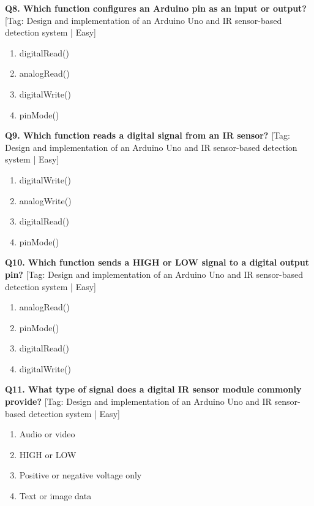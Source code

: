 \noindent\textbf{Q8. Which function configures an Arduino pin as an input or output?} \hfill [Tag: Design and implementation of an Arduino Uno and IR sensor-based detection system | Easy]
\begin{enumerate}[label=(\alph*),topsep=2pt,itemsep=1pt,partopsep=0pt,parsep=0pt]
    \item {digitalRead()}
    \item {analogRead()}
    \item {digitalWrite()}
    \item {pinMode()}
\end{enumerate}
\vspace{2mm}

\noindent\textbf{Q9. Which function reads a digital signal from an IR sensor?} \hfill [Tag: Design and implementation of an Arduino Uno and IR sensor-based detection system | Easy]
\begin{enumerate}[label=(\alph*),topsep=2pt,itemsep=1pt,partopsep=0pt,parsep=0pt]
    \item {digitalWrite()}
    \item {analogWrite()}
    \item {digitalRead()}
    \item {pinMode()}
\end{enumerate}
\vspace{2mm}

\noindent\textbf{Q10. Which function sends a HIGH or LOW signal to a digital output pin?} \hfill [Tag: Design and implementation of an Arduino Uno and IR sensor-based detection system | Easy]
\begin{enumerate}[label=(\alph*),topsep=2pt,itemsep=1pt,partopsep=0pt,parsep=0pt]
    \item {analogRead()}
    \item {pinMode()}
    \item {digitalRead()}
    \item {digitalWrite()}
\end{enumerate}
\vspace{2mm}

\noindent\textbf{Q11. What type of signal does a digital IR sensor module commonly provide?} \hfill [Tag: Design and implementation of an Arduino Uno and IR sensor-based detection system | Easy]
\begin{enumerate}[label=(\alph*),topsep=2pt,itemsep=1pt,partopsep=0pt,parsep=0pt]
    \item {Audio or video}
    \item {HIGH or LOW}
    \item {Positive or negative voltage only}
    \item {Text or image data}
\end{enumerate}
\vspace{2mm}

